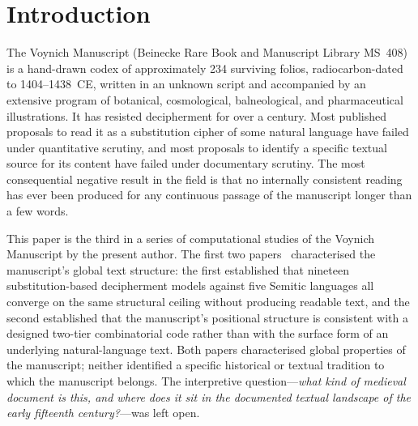 
\section{Introduction}
\label{sec:intro}

The Voynich Manuscript (Beinecke Rare Book and Manuscript Library MS~408)
is a hand-drawn codex of approximately 234 surviving folios, radiocarbon-dated
to 1404--1438~CE, written in an unknown script and accompanied by an
extensive program of botanical, cosmological, balneological, and
pharmaceutical illustrations. It has resisted decipherment for over a
century. Most published proposals to read it as a substitution cipher of
some natural language have failed under quantitative scrutiny, and most
proposals to identify a specific textual source for its content have
failed under documentary scrutiny. The most consequential negative result
in the field is that no internally consistent reading has ever been
produced for any continuous passage of the manuscript longer than a few
words.

This paper is the third in a series of computational studies of the
Voynich Manuscript by the present author. The first two
papers~\citep{jimenez2026negative,jimenez2026twotier} characterised the
manuscript's global text structure: the first established that nineteen
substitution-based decipherment models against five Semitic languages
all converge on the same structural ceiling without producing readable
text, and the second established that the manuscript's positional
structure is consistent with a designed two-tier combinatorial code
rather than with the surface form of an underlying natural-language
text. Both papers characterised global properties of the manuscript;
neither identified a specific historical or textual tradition to which
the manuscript belongs. The interpretive question---\emph{what kind of
medieval document is this, and where does it sit in the documented
textual landscape of the early fifteenth century?}---was left open.

